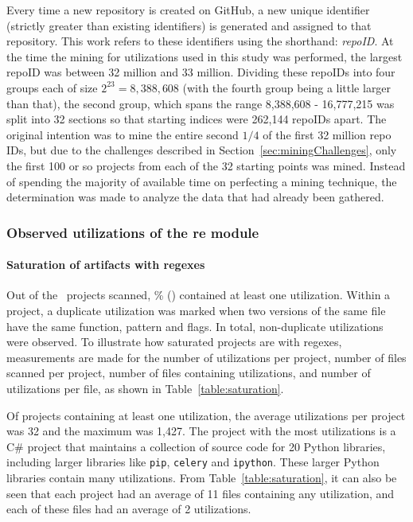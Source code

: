 Every time a new repository is created on GitHub, a new unique identifier (strictly greater than existing identifiers) is generated and assigned to that repository.  This work refers to these identifiers using the shorthand: \emph{repoID}.  At the time the mining for utilizations used in this study was performed, the largest repoID was between 32 million and 33 million.  Dividing these repoIDs into four groups each of size $2^{23} = 8,388,608$ (with the fourth group being a little larger than that), the second group, which spans the range 8,388,608 - 16,777,215 was split into 32 sections so that starting indices were 262,144 repoIDs apart.  The original intention was to mine the entire second $1/4$ of the first 32 million repo IDs, but due to the challenges described in Section~\ref{sec:miningChallenges}, only the first 100 or so projects from each of the 32 starting points was mined.  Instead of spending the majority of available time on perfecting a mining technique, the determination was made to analyze the data that had already been gathered.

\pagebreak

\subsubsection{Observed utilizations of the re module}
\paragraph{Saturation of artifacts with regexes} Out of the \ projects scanned, \% () contained at least one utilization.  Within a project, a duplicate utilization was marked when two versions of the same file have the same function, pattern and flags.  In total,  non-duplicate utilizations were observed.  To illustrate how saturated projects are with regexes, measurements are made for the number of utilizations per project, number of files scanned per project, number of files containing utilizations, and number of utilizations  per file, as shown in Table~\ref{table:saturation}.

Of projects containing at least one utilization, the average utilizations per project was 32 and the maximum  was 1,427.  The project with the most utilizations is a C\# project that maintains a collection of source code for 20 Python libraries, including larger libraries like {\tt pip}, {\tt celery} and {\tt ipython}.  These larger Python libraries contain many utilizations.
From Table~\ref{table:saturation}, it can also be seen that each project had an average of 11 files containing any utilization, and each of these files had an average of 2 utilizations.

